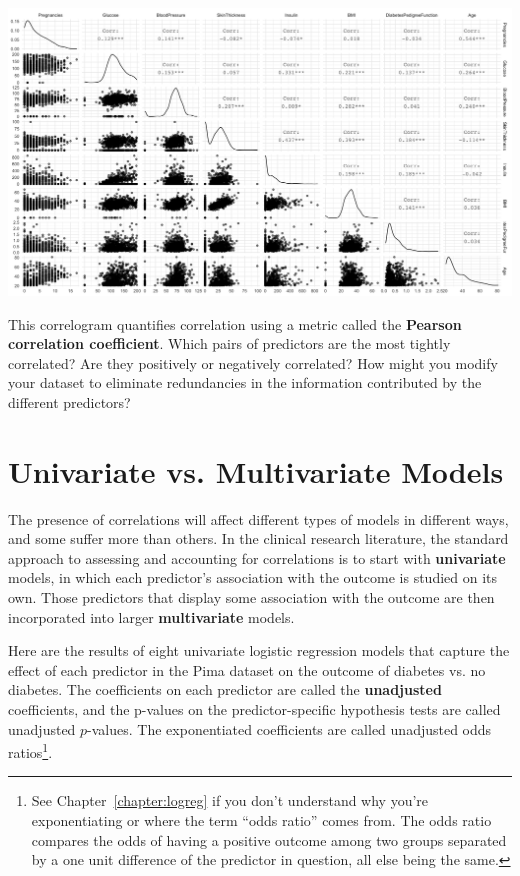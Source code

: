 \begin{center}
\includegraphics[width=\textwidth]{img/pima-ggpairs.png}
\end{center}

\begin{question}{}
This correlogram quantifies correlation using a metric called the \textbf{Pearson correlation coefficient}. Which pairs of predictors are the most tightly correlated? Are they positively or negatively correlated? How might you modify your dataset to eliminate redundancies in the information contributed by the different predictors?
\end{question}


\section{Univariate vs. Multivariate Models \label{section:redund}}

The presence of correlations will affect different types of models in different ways, and some suffer more than others. In the clinical research literature, the standard approach to assessing and accounting for correlations is to start with \textbf{univariate} models, in which each predictor's association with the outcome is studied on its own. Those predictors that display some association with the outcome are then incorporated into larger \textbf{multivariate} models.

Here are the results of eight univariate logistic regression models that capture the effect of each predictor in the Pima dataset on the outcome of diabetes vs. no diabetes. The coefficients on each predictor are called the \textbf{unadjusted} coefficients, and the p-values on the predictor-specific hypothesis tests are called unadjusted $p$-values. The exponentiated coefficients are called unadjusted odds ratios\footnote{See Chapter~\ref{chapter:logreg} if you don't understand why you're exponentiating or where the term ``odds ratio'' comes from. The odds ratio compares the odds of having a positive outcome among two groups separated by a one unit difference of the predictor in question, all else being the same.}.
\vspace{-3mm}

